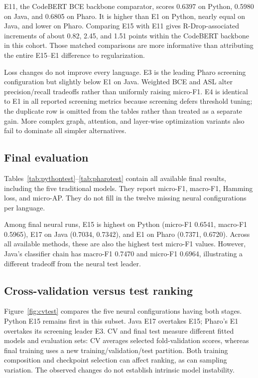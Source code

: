 E11, the CodeBERT BCE backbone comparator, scores 0.6397 on Python, 0.5980 on Java, and 0.6805 on Pharo. It is higher than E1 on Python, nearly equal on Java, and lower on Pharo. Comparing E15 with E11 gives R-Drop-associated increments of about 0.82, 2.45, and 1.51 points within the CodeBERT backbone in this cohort. Those matched comparisons are more informative than attributing the entire E15--E1 difference to regularization.

Loss changes do not improve every language. E3 is the leading Pharo screening configuration but slightly below E1 on Java. Weighted BCE and ASL alter precision/recall tradeoffs rather than uniformly raising micro-F1. E4 is identical to E1 in all reported screening metrics because screening defers threshold tuning; the duplicate row is omitted from the tables rather than treated as a separate gain. More complex graph, attention, and layer-wise optimization variants also fail to dominate all simpler alternatives.

\subsection{Final evaluation}
Tables~\ref{tab:pythontest}--\ref{tab:pharotest} contain all available final results, including the five traditional models. They report micro-F1, macro-F1, Hamming loss, and micro-AP. They do not fill in the twelve missing neural configurations per language.




Among final neural runs, E15 is highest on Python (micro-F1 0.6541, macro-F1 0.5965), E17 on Java (0.7034, 0.7342), and E1 on Pharo (0.7371, 0.6720). Across all available methods, these are also the highest test micro-F1 values. However, Java's classifier chain has macro-F1 0.7470 and micro-F1 0.6964, illustrating a different tradeoff from the neural test leader.

\subsection{Cross-validation versus test ranking}
Figure~\ref{fig:cvtest} compares the five neural configurations having both stages. Python E15 remains first in this subset. Java E17 overtakes E15; Pharo's E1 overtakes its screening leader E3. CV and final test measure different fitted models and evaluation sets: CV averages selected fold-validation scores, whereas final training uses a new training/validation/test partition. Both training composition and checkpoint selection can affect ranking, as can sampling variation. The observed changes do not establish intrinsic model instability.

